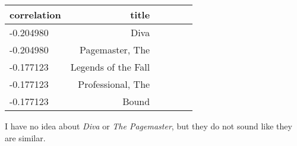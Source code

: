 \documentclass[12pt, a4paper]{article}
\begin{document}
\begin{minipage}{\linewidth} %
\vspace{2em}
\centering
\begin{tabular}{|l|r|r|l|l|l|}
        \hline
        correlation & title\\
        \hline
        -0.204980 & Diva\\
        \hline
        -0.204980 & Pagemaster, The\\
        \hline
        -0.177123 & Legends of the Fall\\
        \hline
        -0.177123 & Professional, The\\
        \hline
        -0.177123 & Bound\\
        \hline
\end{tabular}
\vspace{2em}
\end{minipage}

I have no idea about \emph{Diva} or \emph{The Pagemaster}, but they do not sound like they are similar.
\end{document}
